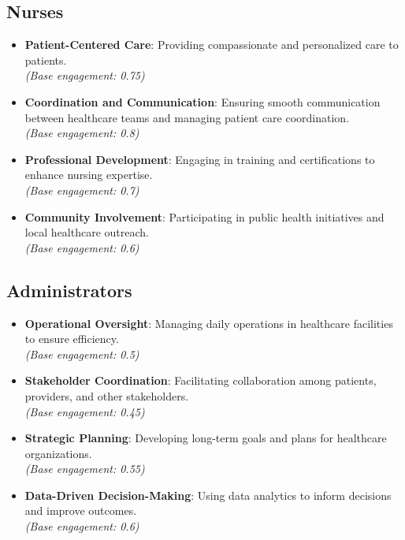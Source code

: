 \documentclass{article}
\begin{document}
	\subsection*{Nurses}
	\begin{itemize}[label=--]
		\item \textbf{Patient-Centered Care}: Providing compassionate and personalized care to patients. \\ \textit{(Base engagement: 0.75)}
		\item \textbf{Coordination and Communication}: Ensuring smooth communication between healthcare teams and managing patient care coordination. \\ \textit{(Base engagement: 0.8)}
		\item \textbf{Professional Development}: Engaging in training and certifications to enhance nursing expertise. \\ \textit{(Base engagement: 0.7)}
		\item \textbf{Community Involvement}: Participating in public health initiatives and local healthcare outreach. \\ \textit{(Base engagement: 0.6)}
	\end{itemize}
	
	\subsection*{Administrators}
	\begin{itemize}[label=--]
		\item \textbf{Operational Oversight}: Managing daily operations in healthcare facilities to ensure efficiency. \\ \textit{(Base engagement: 0.5)}
		\item \textbf{Stakeholder Coordination}: Facilitating collaboration among patients, providers, and other stakeholders. \\ \textit{(Base engagement: 0.45)}
		\item \textbf{Strategic Planning}: Developing long-term goals and plans for healthcare organizations. \\ \textit{(Base engagement: 0.55)}
		\item \textbf{Data-Driven Decision-Making}: Using data analytics to inform decisions and improve outcomes. \\ \textit{(Base engagement: 0.6)}
	\end{itemize}
	
\end{document}
